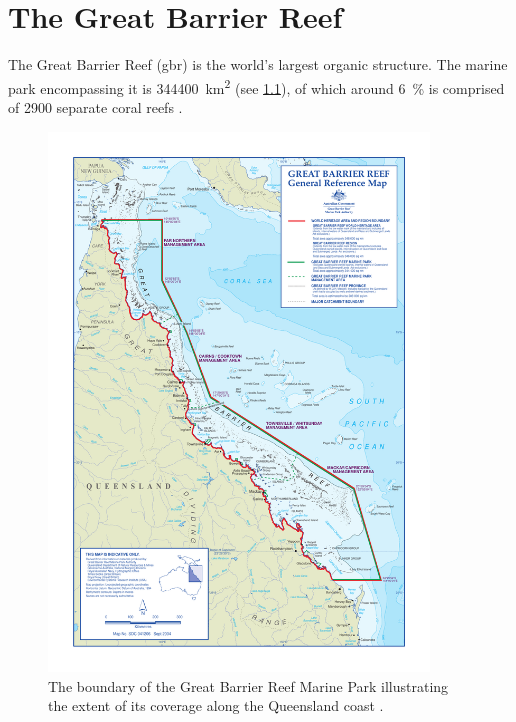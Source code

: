 




\chapter{The Great Barrier Reef}
\label{ch:gbr}

	The Great Barrier Reef (\gls{gbr}) is the world's largest organic structure. The marine park encompassing it is \SI{344400}{\square\km} (see \cref{fig:gbrboundary}), of which around \SI{6}{\percent} is comprised of \SI{2900}{} separate coral reefs \citep{borthwick:2006uv}.

	\begin{figure}[!htb]
	    \centering
	    \includegraphics[width=0.9\textwidth,natwidth=787,natheight=1135]{Fig/Literature_Review/GBR_map.pdf}
	    \caption{The boundary of the Great Barrier Reef Marine Park illustrating the extent of its coverage along the Queensland coast \citep{borthwick:2006uv}.}
	    \label{fig:gbrboundary}
	\end{figure}

